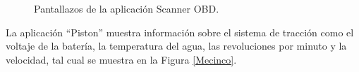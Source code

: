 \begin{figure}[H]
\centering
{}\hspace{10mm}
\caption{Pantallazos de la aplicación Scanner OBD.} \label{Mecuatro}
\end{figure}


La aplicación “Piston” muestra información sobre el sistema de tracción como el voltaje de la batería, la temperatura del agua, las revoluciones por minuto y la velocidad, tal cual se muestra en la Figura \ref{Mecinco}.

